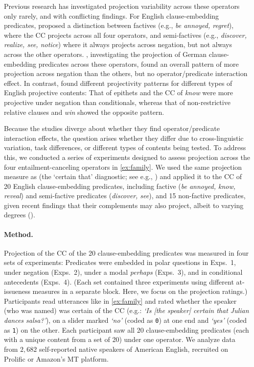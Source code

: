 \documentclass[11pt, a4paper]{article}
\begin{document}
	\noindent
	Previous research has investigated projection variability across these operators only rarely, and with conflicting findings.
	For English clause-embedding predicates, \citet{karttunen_observations_1971} proposed a distinction between factives (e.g., \emph{be annoyed, regret}), where the CC projects across all four operators, and semi-factives (e.g., \emph{discover, realize, see, notice}) where it always projects across negation, but not always across the other operators.
	\cite{sieker_projective_2022}, investigating the projection of German clause-embedding predicates across these operators, found an overall pattern of more projection across negation than the others, but no operator/predicate interaction effect.
	In contrast, \citet{smith_relationship_2014} found different projectivity patterns for different types of English projective contents: That of epithets and the CC of \emph{know} were more projective under negation than conditionals, whereas that of non-restrictive relative clauses and \emph{win} showed the opposite pattern.

	Because the studies diverge about whether they find operator/predicate interaction effects, the question arises whether they differ due to cross-linguistic variation, task differences, or different types of contents being tested. To address this, we conducted a series of experiments designed to assess projection across the four entailment-canceling operators in \ref{ex:family}. We used the same projection measure as \citet{sieker_projective_2022} (the `certain that' diagnostic; see e.g., \citealp{tonhauser_how_2018,djarv_prosodic_2017,mahler_social_2020}) and applied it to the CC of 20 English clause-embedding predicates, including factive (\emph{be annoyed, know, reveal}) and semi-factive predicates (\emph{discover, see}),
	and 15 non-factive predicates, given recent findings that their complements may also project, albeit to varying degrees (\citealt{degen_are_2022}).

\paragraph{Method.}
	Projection of the CC of the 20 clause-embedding predicates was measured in four sets of experiments: Predicates were embedded in polar questions in Exps.\ 1, under negation (Exps.\ 2), under a modal {\em perhaps} (Exps.\ 3), and in conditional antecedents (Exps.\ 4). (Each set contained three experiments using different at-issueness measures in a separate block. Here, we focus on the projection ratings.)
	Participants read utterances like in \ref{ex:family} and rated whether the speaker (who was named) was certain of the CC (e.g.: \emph{\lq Is [the speaker] certain that Julian dances salsa?\rq}), on a slider marked \emph{`no'} (coded as \texttt{0}) at one end and \emph{`yes'} (coded as \texttt{1}) on the other. Each participant saw all 20 clause-embedding predicates (each with a unique content from a set of 20) under one operator. We analyze data from $2,682$ self-reported native speakers of American English, recruited on Prolific or Amazon's MT platform.
\end{document}
